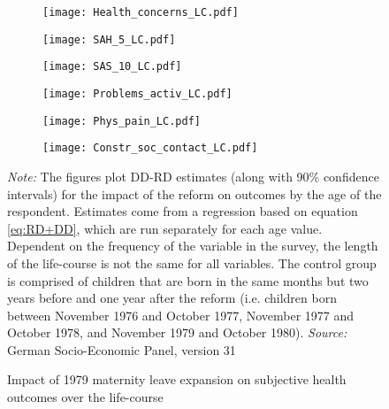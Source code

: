 \documentclass[a4paper ]{article}
\begin{document}
\newpage
\begin{figure}[p]
\begin{subfigure}[h]{0.48\textwidth}\centering
	\texttt{[image: Health\_concerns\_LC.pdf]}
\end{subfigure}
\quad
\begin{subfigure}[h]{0.48\textwidth}\centering
	\texttt{[image: SAH\_5\_LC.pdf]}
\end{subfigure}

\begin{subfigure}[h]{0.48\textwidth}\centering
	\texttt{[image: SAS\_10\_LC.pdf]}
\end{subfigure}
\quad
\begin{subfigure}[h]{0.48\textwidth}\centering
	\texttt{[image: Problems\_activ\_LC.pdf]}
\end{subfigure}



\begin{subfigure}[h]{0.48\textwidth}\centering
	\texttt{[image: Phys\_pain\_LC.pdf]}
\end{subfigure}
\quad
\begin{subfigure}[h]{0.48\textwidth}\centering
	\texttt{[image: Constr\_soc\_contact\_LC.pdf]}
\end{subfigure}


\caption{Impact of 1979 maternity leave expansion on subjective health outcomes over the life-course}\label{fig: LC_SH}
\begin{minipage}{\textwidth} %
{\footnotesize \textit{Note:} The figures plot DD-RD estimates (along with 90\% confidence intervals) for the impact of the reform on outcomes by the age of the respondent. Estimates come from a regression based on equation \ref{eq:RD+DD}, which are run separately for each age value. Dependent on the frequency of the variable in the survey, the length of the life-course is not the same for all variables. The control group is comprised of children that are born in the same months but two years before and one year after the reform (i.e. children born between November 1976 and October 1977, November 1977 and October 1978, and November 1979 and October 1980). \newline \textit{Source: }German Socio-Economic Panel, version 31\par}
\end{minipage}
\end{figure}
\end{document}
